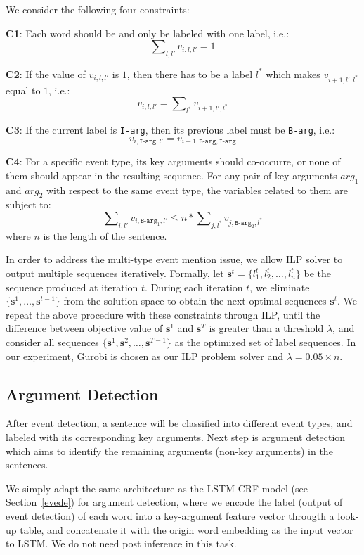 We consider the following four constraints:

\textbf{C1}: Each word should be and only be labeled with one label, i.e.:
\begin{equation}
	\sum\nolimits_{l,l'}v_{i,l,l'}=1
\end{equation}

\textbf{C2}: If the value of $v_{i,l,l'}$ is $1$, then there has to be a label $l^*$ which makes $v_{i+1,l',l^*}$ equal to $1$, i.e.:
\begin{equation}
	v_{i,l,l'} = \sum\nolimits_{l^*}v_{i+1,l',l^*}
\end{equation}

\textbf{C3}: If the current label is \texttt{I-arg}, then its previous label must be \texttt{B-arg}, i.e.:
\begin{equation}
	v_{i,\texttt{I-arg},l'} = v_{i-1,\texttt{B-arg},\texttt{I-arg}}
\end{equation}

\textbf{C4}: For a specific event type, its key arguments should co-occurre, or none of them should appear in the resulting sequence. For any pair of key arguments $arg_1$ and $arg_2$ with respect to the same event type, the variables related to them are subject to:
\begin{equation}
	\sum\nolimits_{i,l'}{v_{i,\texttt{B-arg}_1,l'}} \leq n * \sum\nolimits_{j,l^*}{v_{j,\texttt{B-arg}_2,l^*}}
\end{equation}
where $n$ is the length of the sentence.

In order to address the multi-type event mention issue, we allow ILP solver to output multiple sequences iteratively. Formally, let $\bm{s}^t=\{l_1^t, l_2^t, \ldots, l_n^t\}$ be the sequence produced at iteration $t$. During each iteration $t$, we eliminate $\{\bm{s}^1, \ldots, \bm{s}^{t-1}\}$ from the solution space to obtain the next optimal sequences $\bm{s}^t$. We repeat the above procedure with these constraints through ILP, until the difference between objective value of $\bm{s}^1$ and $\bm{s}^T$ is greater than a threshold $\lambda$, and consider all sequences $\{\bm{s}^1, \bm{s}^2, \ldots, \bm{s}^{T-1}\}$ as the optimized set of label sequences. In our experiment, Gurobi \cite{gurobi} is chosen as our ILP problem solver and $\lambda=0.05 \times n$.

\subsection{Argument Detection}
After event detection, a sentence will be classified into different event types, and labeled with its corresponding key arguments. Next step is argument detection which aims to identify the remaining arguments (non-key arguments) in the sentences.  

We simply adapt the same architecture as the LSTM-CRF model (see Section~\ref{evede}) for argument detection, where we encode the label (output of event detection) of each word into a key-argument feature vector througth a look-up table, and concatenate it with the origin word embedding as the input vector to LSTM. We do not need post inference in this task.
